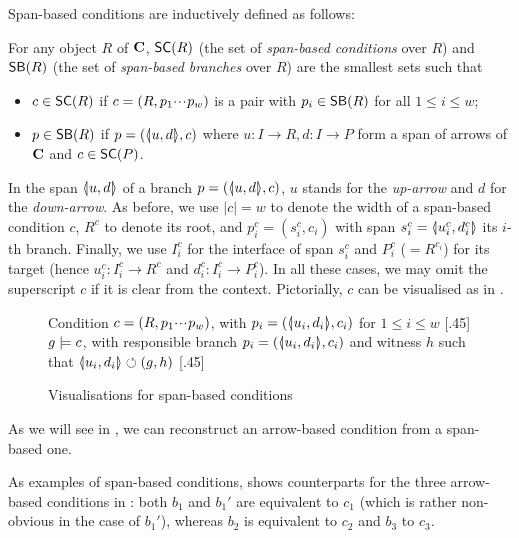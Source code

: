 \medskip\noindent
Span-based conditions are inductively defined as follows:

\begin{definition}\label{def:sb-condition}
  For any object $R$ of $\mathbf{C}$, $\SC R$ (the set of \emph{span-based conditions} over $R$) and $\SB R$ (the set of \emph{span-based branches} over $R$) are the smallest sets such that
  \begin{itemize}
  \item $c\in \SC R$ if $c=(R,p_1{\cdotp\mkern-2mu\cdotp\mkern-2mu\cdotp\mkern1mu} p_w)$ is a pair with $p_i\in \SB R$ for all $1\leq i\leq w$;
  \item $p\in \SB R$ if $p=(\spanof u d,c)$ where $u: I\to R, d:I\to P$ form a span of arrows of $\mathbf{C}$ and $c\in \SC P$.
  \end{itemize}
\end{definition}
%
In the span $\spanof u d$ of a branch $p=(\spanof u d,c)$, $u$ stands for the \emph{up-arrow} and $d$ for the \emph{down-arrow}. As before, we use $|c|=w$ to denote the width of a span-based condition $c$, $R^c$ to denote its root, and $p^c_i=(s^c_i,c_i)$ with span $s^c_i=\spanof{u^c_i}{d^c_i}$ its $i$-th branch. Finally, we use $I^c_i$ for the interface of span $s^c_i$ and $P^c_i$ ($=R^{c_i}$) for its target (hence $u^c_i:I^c_i\to R^c$ and $d^c_i:I^c_i\rightarrow P^c_i$). In all these cases, we may omit the superscript $c$ if it is clear from the context. Pictorially, $c$ can be visualised as in .
%
\begin{figure}[t]
\centering
\subcaptionbox
  {Condition $c=(R,p_1{\cdotp\mkern-2mu\cdotp\mkern-2mu\cdotp\mkern1mu} p_w)$, with $p_i=(\spanof{u_i}{d_i},c_i)$ for $1\leq i\leq w$
   }
  [.45\textwidth]
  {}
\qquad
\subcaptionbox
  {$g\models c$, with responsible branch $p_i=(\spanof{u_i}{d_i},c_i)$ and witness $h$ such that $\spanof{u_i}{d_i}\commutes (g,h)$
   }
  [.45\textwidth]
  {}
\vspace*{-2mm}
\caption{Visualisations for span-based conditions}
\end{figure}
%
As we will see in , we can reconstruct an arrow-based condition from a span-based one.

As examples of span-based conditions,  shows counterparts for the three arrow-based conditions in : both $b_1$ and $b_1'$ are equivalent to $c_1$ (which is rather non-obvious in the case of $b_1'$), whereas $b_2$ is equivalent to $c_2$ and $b_3$ to $c_3$.

